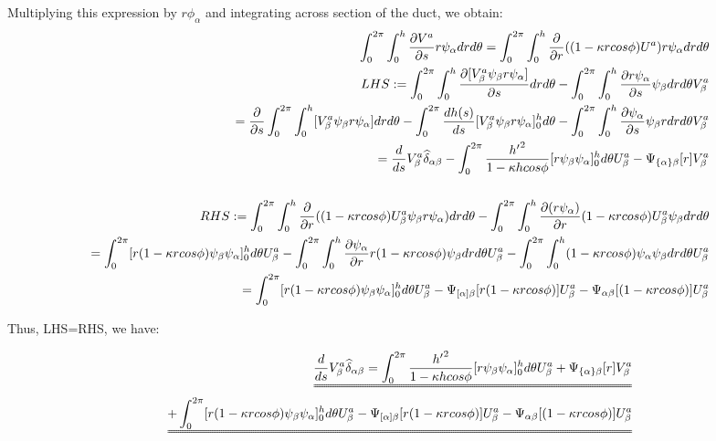 \documentclass{Note}
\begin{document}
Multiplying this expression by $r\phi_\alpha$ and integrating across section of the duct, we obtain:
\begin{equation}
\begin{aligned}
\int_0^{2\pi}\int_0^h {\partial V^a \over \partial s} r \psi_\alpha dr d\theta=
\int_0^{2\pi}\int_0^h {\partial \over \partial r}((1-\kappa r cos\phi)U^a) r \psi_\alpha dr d\theta\\
LHS:
=\int_0^{2\pi}\int_0^h {\partial [V_\beta^a \psi_\beta r  \psi_\alpha] \over \partial s}  dr d\theta-\int_0^{2\pi}\int_0^h {\partial r  \psi_\alpha  \over \partial s}   \psi_\beta dr d\theta V_\beta^a\\
={\partial \over \partial s}\int_0^{2\pi}\int_0^h [V_\beta^a \psi_\beta r  \psi_\alpha ]  dr d\theta-\int_0^{2\pi}{dh(s)\over ds} [V_\beta^a \psi_\beta r  \psi_\alpha ]_0^h d\theta
-\int_0^{2\pi}\int_0^h {\partial  \psi_\alpha  \over \partial s}   \psi_\beta r  dr d\theta V_\beta^a\\
={d \over d s} V_\beta^a\widehat{\delta }_{\alpha\beta}-\int_0^{2\pi}{{h'}^2\over {1-\kappa h cos\phi}}[r \psi_\beta \psi_\alpha ]_0^h d\theta U_\beta^a -\Psi_{\{\alpha\}\beta}[r]V_\beta^a\\
\\
RHS:=\int_0^{2\pi}\int_0^h {\partial \over \partial r}((1-\kappa r cos\phi)U_\beta^a \psi_\beta r \psi_\alpha) dr d\theta-\int_0^{2\pi}\int_0^h {\partial (  r \psi_\alpha)\over \partial r}(1-\kappa r cos\phi)U_\beta^a  \psi_\beta  dr d\theta\\
=\int_0^{2\pi}[ r (1-\kappa r cos\phi) \psi_\beta \psi_\alpha]_0^h d\theta U_\beta^a
-\int_0^{2\pi}\int_0^h {\partial \psi_\alpha\over \partial r} r(1-\kappa r cos\phi) \psi_\beta  dr d\theta U_\beta^a 
-\int_0^{2\pi}\int_0^h (1-\kappa r cos\phi)  \psi_\alpha \psi_\beta  dr d\theta U_\beta^a\\
=\int_0^{2\pi}[ r (1-\kappa r cos\phi) \psi_\beta \psi_\alpha]_0^h d\theta U_\beta^a
-\Psi_{[\alpha]\beta}[r(1-\kappa r cos\phi)]U_\beta^a
-\Psi_{\alpha\beta}[(1-\kappa r cos\phi)]U_\beta^a\\
\end{aligned}
\end{equation}

Thus, LHS=RHS, we have:

\begin{equation}
\begin{aligned}
\uuline{{d \over ds} V_\beta^a \widehat{\delta }_{\alpha\beta}=\int_0^{2\pi}{{h'}^2\over {1-\kappa h cos\phi}}[r \psi_\beta \psi_\alpha ]_0^h d\theta U_\beta^a +\Psi_{\{\alpha\}\beta}[r]V_\beta^a}\\
\uuline{+\int_0^{2\pi}[ r (1-\kappa r cos\phi) \psi_\beta \psi_\alpha]_0^h d\theta U_\beta^a
-\Psi_{[\alpha]\beta}[r(1-\kappa r cos\phi)]U_\beta^a
-\Psi_{\alpha\beta}[(1-\kappa r cos\phi)]U_\beta^a}\\
\end{aligned}
\end{equation}
\end{document}
